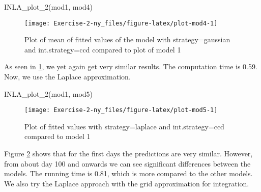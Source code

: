 \documentclass[
]{article}
\newenvironment{Shaded}{\begin{snugshade}}{\end{snugshade}}
\newcommand{\AttributeTok}[1]{\textcolor[rgb]{0.77,0.63,0.00}{#1}}
\newcommand{\FunctionTok}[1]{\textcolor[rgb]{0.00,0.00,0.00}{#1}}
\newcommand{\NormalTok}[1]{#1}
\newcommand{\OtherTok}[1]{\textcolor[rgb]{0.56,0.35,0.01}{#1}}
\newcommand{\SpecialCharTok}[1]{\textcolor[rgb]{0.00,0.00,0.00}{#1}}
\newcommand{\StringTok}[1]{\textcolor[rgb]{0.31,0.60,0.02}{#1}}
\begin{document}
\begin{Shaded}
\begin{Highlighting}[]
\FunctionTok{INLA\_plot\_2}\NormalTok{(mod1, mod4)}
\end{Highlighting}
\end{Shaded}

\begin{figure}

{\centering \texttt{[image: Exercise-2-ny\_files/figure-latex/plot-mod4-1]} 

}

\caption{Plot of mean of fitted values of the model with strategy=gaussian and int.strategy=ccd compared to plot of model 1}\label{fig:plot-mod4}
\end{figure}

As seen in \ref{fig:plot-mod4}, we yet again get very similar results. The computation time is 0.59. Now, we use the Laplace approximation.

\begin{Shaded}
\end{Shaded}

\begin{Shaded}
\begin{Highlighting}[]
\FunctionTok{INLA\_plot\_2}\NormalTok{(mod1, mod5)}
\end{Highlighting}
\end{Shaded}

\begin{figure}

{\centering \texttt{[image: Exercise-2-ny\_files/figure-latex/plot-mod5-1]} 

}

\caption{Plot of fitted values with strategy=laplace and int.strategy=ccd compared to model 1}\label{fig:plot-mod5}
\end{figure}

Figure \ref{fig:plot-mod5} shows that for the first days the predictions are very similar. However, from about day 100 and onwards we can see significant differences between the models. The running time is 0.81, which is more compared to the other models.
We also try the Laplace approach with the grid approximation for integration.
\end{document}
